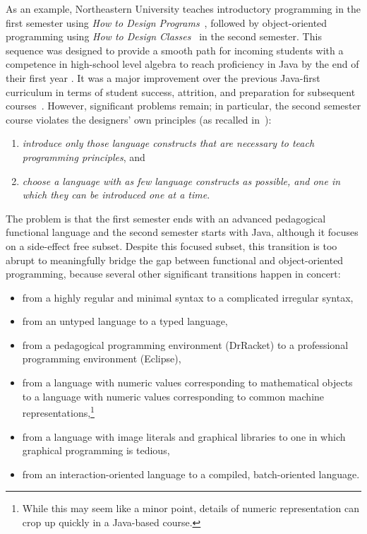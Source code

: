 \documentclass[submission,copyright]{eptcs}
\begin{document}
As an example, Northeastern University teaches introductory programming
in the first semester using \emph{How to Design
  Programs}~\cite{dvanhorn:Felleisen2001How}, followed by
object-oriented programming using \emph{How to Design
  Classes}~\cite{local:htdc} in the second semester.  This sequence
was designed to provide a smooth path for incoming students with
 a competence in high-school level algebra to reach
proficiency in Java by the end of their first year
\cite{dvanhorn:Felleisen2004Structure}.  It was a major improvement
over the previous Java-first curriculum in terms of student success,
attrition, and preparation for subsequent
courses~\cite{dvanhorn:Proulx2006Design}.  However, significant
problems remain; in particular, the second semester course violates
the designers' own principles (as recalled
in~\cite{dvanhorn:Bloch2000Scheme}):
%
\begin{enumerate}
\item \emph{introduce only those language constructs that are necessary to
  teach programming principles}, and
\item \emph{choose a language with as
  few language constructs as possible, and one in which they can be
  introduced one at a time}.
\end{enumerate}

The problem is that the first semester ends with an advanced
pedagogical functional language and the second semester starts with
Java, although it focuses on a side-effect free subset.  Despite this focused
subset, this transition is too abrupt to meaningfully bridge the gap
between functional and object-oriented programming, because
several other significant transitions happen in concert:
\begin{itemize}
\item from a highly regular and minimal syntax to a complicated
  irregular syntax,

\item from an untyped language to a typed language,

\item from a pedagogical programming environment (DrRacket) to a professional
programming environment (Eclipse),

\item from a language with numeric values corresponding to
  mathematical objects to a language with numeric values corresponding
  to common machine representations,\footnote{While this may seem like
    a minor point, details of numeric representation can crop up
    quickly in a Java-based course.}

\item from a language with image literals and graphical libraries to
  one in which graphical programming is tedious,

\item from an interaction-oriented language to a compiled,
  batch-oriented language.  
\end{itemize}
\end{document}
